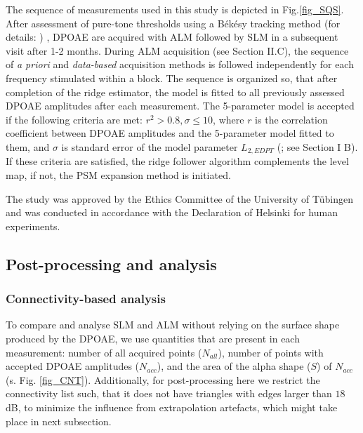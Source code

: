 \documentclass[journal,twoside,web]{ieeecolor2}
\begin{document}
The sequence of measurements used in this study is depicted in Fig.\ref{fig_SQS}.
After assessment of pure-tone thresholds using a Békésy tracking method (for details: \cite{Br2021}) , DPOAE are acquired with ALM followed by SLM in a subsequent visit after 1-2 months.
During ALM acquisition (see Section II.C), the sequence of \textit{a priori} and \textit{data-based} acquisition methods is followed independently for each frequency stimulated within a block.
The sequence is organized so, that after completion of the ridge estimator, the model is fitted to all previously assessed DPOAE amplitudes after each measurement.
The 5-parameter model is accepted if the following criteria are met: $r^2 > 0.8, \sigma \le 10$, where $r$ is the correlation coefficient between DPOAE amplitudes and the 5-parameter model fitted to them, and $\sigma $ is standard error of the model parameter $L_{2, EDPT}$ (\cite{ZD2020}; see Section I B).
If these criteria are satisfied, the ridge follower algorithm complements the level map, if not, the PSM expansion method is initiated.


The study was approved by the Ethics Committee of the University of Tübingen and   was conducted in accordance with the Declaration of Helsinki for human experiments.

\subsection{Post-processing and analysis}
\label{sec2_pproc}

\subsubsection{Connectivity-based analysis}
To compare and analyse SLM and ALM without relying on the surface shape produced by the DPOAE, we use quantities that are present in each measurement: number of all acquired points ($N_{all}$), number of points with accepted DPOAE amplitudes ($N_{acc}$), and the area of the alpha shape ($S$) of $N_{acc}$ (s. Fig. \ref{fig_CNT}).
Additionally, for post-processing here we restrict the connectivity list such, that it does not have triangles with edges larger than $18$ dB, to minimize the influence from extrapolation artefacts, which might take place in next subsection.
\end{document}

